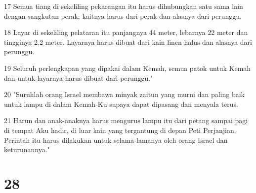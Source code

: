 \par 17 Semua tiang di sekeliling pekarangan itu harus dihubungkan satu sama lain dengan sangkutan perak; kaitnya harus dari perak dan alasnya dari perunggu.
\par 18 Layar di sekeliling pelataran itu panjangnya 44 meter, lebarnya 22 meter dan tingginya 2,2 meter. Layarnya harus dibuat dari kain linen halus dan alasnya dari perunggu.
\par 19 Seluruh perlengkapan yang dipakai dalam Kemah, semua patok untuk Kemah dan untuk layarnya harus dibuat dari perunggu."
\par 20 "Suruhlah orang Israel membawa minyak zaitun yang murni dan paling baik untuk lampu di dalam Kemah-Ku supaya dapat dipasang dan menyala terus.
\par 21 Harun dan anak-anaknya harus mengurus lampu itu dari petang sampai pagi di tempat Aku hadir, di luar kain yang tergantung di depan Peti Perjanjian. Perintah itu harus dilakukan untuk selama-lamanya oleh orang Israel dan keturunannya."

\chapter{28}

